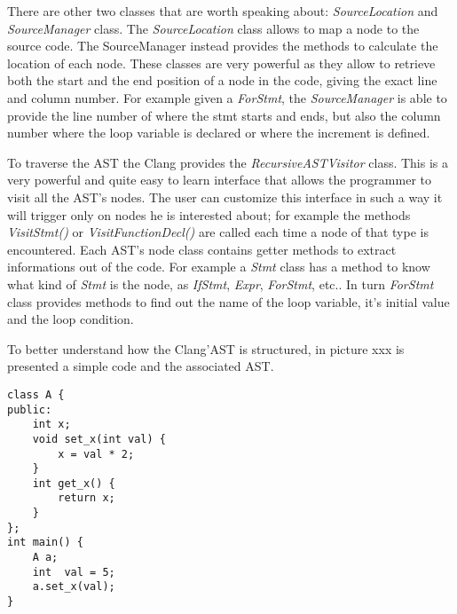 \documentclass[a4paper,11pt,oneside]{book}
\begin{document}
There are other two classes that are worth speaking about: \emph{SourceLocation} and \emph{SourceManager} class. The \emph{SourceLocation} class allows to map a node to the source code. The SourceManager instead provides the methods to calculate the location of each node. These classes are very powerful as they allow to retrieve both the start and the end position of a node in the code, giving the exact line and column number. For example given a \emph{ForStmt}, the \emph{SourceManager} is able to provide the line number of where the stmt starts and ends, but also the column number where the loop variable is declared or where the increment is defined.

To traverse the AST the Clang provides the \emph{RecursiveASTVisitor} class. This is a very powerful and quite easy to learn interface that allows the programmer to visit all the AST’s nodes. The user can customize this interface in such a way it will trigger only on nodes he is interested about; for example the methods \emph{VisitStmt()} or \emph{VisitFunctionDecl()} are called each time a node of that type is encountered. Each AST’s node class contains getter methods to extract informations out of the code. For example a \emph{Stmt} class has a method to know what kind of \emph{Stmt} is the node, as \emph{IfStmt}, \emph{Expr}, \emph{ForStmt}, etc.. In turn \emph{ForStmt} class provides methods to find out the name of the loop variable, it’s initial value and the loop condition.

To better understand how the Clang’AST is structured, in picture xxx is presented a simple code and the associated AST.

\begin{lstlisting}
class A {
public:
	int x;
	void set_x(int val) {
		x = val * 2;
	}	
	int get_x() {
		return x;
	}
};
int main() {
	A a;
	int  val = 5;
	a.set_x(val);
}
\end{lstlisting}
\end{document}
